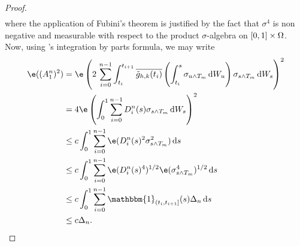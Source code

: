 \begin{proof}
\begin{align}
  \label{eq:dz}
\end{align}
where the application of Fubini's theorem \citep[Theorem VII.36.B]{Halmos1950} is justified by the fact that $\sigma^4$ is non negative and measurable with respect to the product $\sigma$-algebra on $[0,1]\times\Omega$.
Now, using \ito's integration by parts formula, we may write
\begin{align}
  \e((A_1^n)^2)  &= \e\left(2\,\sumin\int_{t_i}^{t_{i+1} }\btghki\left(\int_{t_i}^{s} \sigma_{u \wedge T_m}\D W_u\right)\sigma_{s\wedge T_m} \D W_s\right)^2\notag \\
  & = 4 \e\left(\int_0^{1 }\sumin D_i^n(s) \sigma_{s\wedge T_m} \D W_s\right)^2 \notag \\
  & \le c \int_0^{1 }\sumin\e( D_i^n(s)^2 \sigma_{s\wedge T_m}^2) \D s  \notag \\
  & \le c \int_0^{1 }\sumin\e( D_i^n(s)^4)^{1/2} \e( \sigma_{s\wedge T_m}^4)^{1/2} \D s  \notag \\
  & \le  c \int_0^{1 }\sumin \mathbbm{1}_{(t_i, t_{i+1}]}(s)\Delta_n  \D s  \notag \\
  & \le  c \Delta_n.  \notag 
  \label{}
\end{align}
\begin{comment}
We now note that since $4 \int_0^{1 }\left(\sumin D_i^n(s) \sigma_s\right)^2 \D s$ is increasing finite and continuous, it is locally bounded and therefore locally integrable. It is thus the case that the process defined by, $A_1^n(t) := 2 \int_0^{t}\sumin D_i^n(s) \sigma_s \D W_s$, $t \in \domain$, is a continuous local martingale. As such  $A_1^n(\cdot)$ is locally square integrable with predictable quadratic variation given by    $\langle A_1^n(\cdot) \rangle := 4 \int_0^{\cdot }\left(\sumin D_i^n(s) \sigma_s\right)^2 \D s$. Now let $\{T_n\}$ be a localizing sequence for $A_1^n(\cdot)$, then for any bounded stopping time $T$, we have
$  \e((A_1^n(T\wedge T_n) )^2) = \e(\langle A_1^n (\cdot) \rangle_{T \wedge T_n})$. By Fatou's Lemma $  \e( (A_1^n(T) )^2)  \le \e(\langle A_1^n(\cdot) \rangle_T)$. In other words $(A_1^n(\cdot))^2$ is L-dominated\footnote{The Lenglart domination property is defined in \citet[I.3.29]{Jacod2003}. } by $\langle A_1^n(\cdot) \rangle$.   


\end{comment}
\end{proof}
